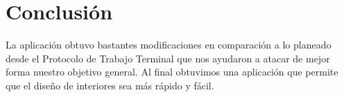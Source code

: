 \chapter{Conclusión}

La aplicación obtuvo bastantes modificaciones en comparación a lo planeado desde el Protocolo de Trabajo Terminal que nos ayudaron a atacar de mejor forma nuestro objetivo general. Al final obtuvimos una aplicación que permite que el diseño de interiores sea más rápido y fácil.
